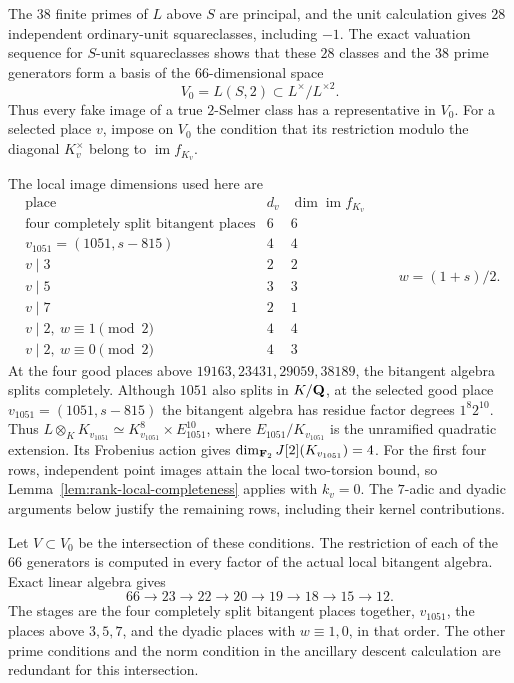 The $38$ finite primes of $L$ above $S$ are principal, and the unit calculation
gives $28$ independent ordinary-unit squareclasses, including $-1$.
The exact valuation sequence for $S$-unit squareclasses shows that
these $28$ classes and the $38$ prime generators form a basis of the
$66$-dimensional space
\[
                    V_0=L(S,2)\subset L^\times/L^{\times2}.
\]
Thus every fake image of a true $2$-Selmer class has a representative
in $V_0$.
For a selected place $v$, impose on $V_0$ the condition that its
restriction modulo the diagonal $K_v^\times$ belong to
$\operatorname{im}f_{K_v}$.

The local image dimensions used here are
\[
\begin{array}{c|c|c}
 \text{place}&d_v&\dim\operatorname{im} f_{K_v}\\ \hline
 \text{four completely split bitangent places}&6&6\\
 v_{1051}=(1051,s-815)&4&4\\
 v\mid3&2&2\\
 v\mid5&3&3\\
 v\mid7&2&1\\
 v\mid2,\ w\equiv1\pmod2&4&4\\
 v\mid2,\ w\equiv0\pmod2&4&3
\end{array}
\qquad w=(1+s)/2.
\]
At the four good places above $19163,23431,29059,38189$, the bitangent
algebra splits completely.  Although $1051$ also splits in $K/\mathbf Q$,
at the selected good place $v_{1051}=(1051,s-815)$ the bitangent algebra
has residue factor degrees $1^8 2^{10}$.  Thus
$L\otimes_K K_{v_{1051}}\simeq K_{v_{1051}}^8\times E_{1051}^{10}$, where
$E_{1051}/K_{v_{1051}}$ is the unramified quadratic extension.  Its Frobenius
action gives $\dim_{\mathbf F_2}J[2](K_{v_{1051}})=4$.
For the first four rows, independent point images attain the local
two-torsion bound, so Lemma~\ref{lem:rank-local-completeness} applies with
$k_v=0$.  The $7$-adic and dyadic arguments below justify the remaining
rows, including their kernel contributions.

Let $V\subset V_0$ be the intersection of these conditions.  The
restriction of each of the $66$ generators is computed in every factor
of the actual local bitangent algebra.  Exact linear algebra gives
\begin{equation}\label{eq:rank-dimensions}
 66\longrightarrow23\longrightarrow22\longrightarrow20
 \longrightarrow19\longrightarrow18\longrightarrow15\longrightarrow12.
\end{equation}
The stages are the four completely split bitangent places together,
$v_{1051}$, the places above
$3,5,7$, and the dyadic places with $w\equiv1,0$, in that order.
The other prime conditions and the norm condition in the ancillary
descent calculation are redundant for this intersection.

